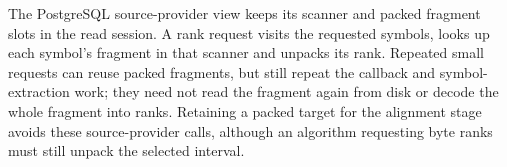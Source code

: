 The PostgreSQL source-provider view keeps its scanner and packed fragment
slots in the read session. A rank request visits the requested symbols,
looks up each symbol's fragment in that scanner and unpacks its rank.
Repeated small requests can reuse packed fragments, but still repeat the
callback and symbol-extraction work; they need not read the fragment again
from disk or decode the whole fragment into ranks.
Retaining a packed target for the alignment stage avoids these
source-provider calls, although an algorithm requesting byte ranks must
still unpack the selected interval.

